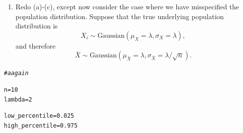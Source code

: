 \documentclass{article}\usepackage[]{graphicx}\usepackage[]{xcolor}
\makeatletter
\newcommand{\hlnum}[1]{\textcolor[rgb]{0.686,0.059,0.569}{#1}}%
\newcommand{\hlcom}[1]{\textcolor[rgb]{0.678,0.584,0.686}{\textit{#1}}}%
\newcommand{\hlopt}[1]{\textcolor[rgb]{0,0,0}{#1}}%
\newcommand{\hldef}[1]{\textcolor[rgb]{0.345,0.345,0.345}{#1}}%
\newcommand{\hlkwb}[1]{\textcolor[rgb]{0.69,0.353,0.396}{#1}}%
\newenvironment{kframe}{%
 \def\at@end@of@kframe{}%
 \ifinner\ifhmode%
  \def\at@end@of@kframe{\end{minipage}}%
  \begin{minipage}{\columnwidth}%
 \fi\fi%
 \def\FrameCommand##1{\hskip\@totalleftmargin \hskip-\fboxsep
 \colorbox{shadecolor}{##1}\hskip-\fboxsep
     \hskip-\linewidth \hskip-\@totalleftmargin \hskip\columnwidth}%
 \MakeFramed {\advance\hsize-\width
   \@totalleftmargin\z@ \linewidth\hsize
   \@setminipage}}%
 {\par\unskip\endMakeFramed%
 \at@end@of@kframe}
\newenvironment{knitrout}{}{} %
\makeatother
\begin{document}
\begin{enumerate}
\begin{enumerate}
\begin{knitrout}
\color{fgcolor}\begin{kframe}
\begin{alltt}
\hldef{(p_outside} \hlkwb{=} \hlnum{1} \hlopt{-} \hldef{p_between)}
\end{alltt}
\begin{verbatim}
## [1] 0.0616
\end{verbatim}
\end{kframe}
\end{knitrout}

\textcolor{red}{P(making observation below the 2.5th percentile or above the 97.5th percentile$\vert \lambda = 2.3$) = 0.0616.}
    
    \item Redo (a)-(c), except now consider the case where we have misspecified 
    the population distribution. Suppose that the true underlying population 
    distribution is 
    \[X_i \sim \textrm{Gaussian}(\mu_X=\lambda, \sigma_X=\lambda),\]
    and therefore
    \[\bar{X} \sim \textrm{Gaussian}(\mu_{\bar{X}}=\lambda, \sigma_{\bar{X}}=\lambda/\sqrt{n}).\]
  \end{enumerate}
  
  
\newpage  
\begin{knitrout}
\color{fgcolor}\begin{kframe}
\begin{alltt}
\hlcom{#a again}

\hldef{n} \hlkwb{=} \hlnum{10}
\hldef{lambda} \hlkwb{=} \hlnum{2}

\hldef{low_percentile} \hlkwb{=} \hlnum{0.025}
\hldef{high_percentile} \hlkwb{=} \hlnum{0.975}


\end{alltt}
\end{kframe}
\end{knitrout}
\end{enumerate}
\end{document}
